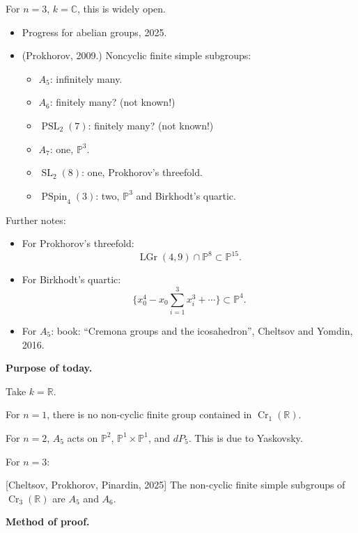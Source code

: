 For $n=3$, $k=\mathbb{C}$, this is
widely open.

\begin{itemize}
\item Progress for abelian groups,
2025.
\item (Prokhorov, 2009.)
Noncyclic finite simple subgroups:

\begin{itemize}
\item $A_5$: infinitely many.
\item $A_6$: finitely many? (not known!)
\item $\operatorname{PSL}_2(7)$:
finitely many? (not known!)
\item $A_7$: one,
$\mathbb{P}^3$.
\item $\operatorname{SL}_2(8)$:
one,
Prokhorov's threefold.
\item $\operatorname{PSpin}_4(3)$:
two,
$\mathbb{P}^3$ and
Birkhodt's quartic.
\end{itemize}
\end{itemize}

\medskip\noindent
Further notes: 
\begin{itemize}
\item For Prokhorov's threefold:
$$
\operatorname{LGr}(4,9)\cap
\mathbb{P}^8
\subset
\mathbb{P}^{15}.
$$

\item For Birkhodt's quartic:
$$
\{x_0^4-x_0\sum_{i=1}^3 x_i^3
+\cdots\}
\subset
\mathbb{P}^4.
$$
\item For $A_5$:
book:
``Cremona groups and the
icosahedron'',
Cheltsov and Yomdin, 2016.
\end{itemize}


\medskip\noindent
{\bf Purpose of today.}

Take $k=\mathbb{R}$.

For $n=1$,
there is no non-cyclic finite group
contained in
$\operatorname{Cr}_1(\mathbb{R})$.

For $n=2$,
$A_5$ acts on
$\mathbb{P}^2$,
$\mathbb{P}^1\times\mathbb{P}^1$,
and $dP_5$.
This is due to Yaskovsky.

For $n=3$:

\begin{theorem}
\label{theorem-cheltsov-prokhorov}
[Cheltsov, Prokhorov,
Pinardin, 2025]
The non-cyclic finite simple
subgroups of
$\operatorname{Cr}_3(\mathbb{R})$
are $A_5$ and $A_6$.
\end{theorem}
\medskip\noindent
{\bf Method of proof.}

